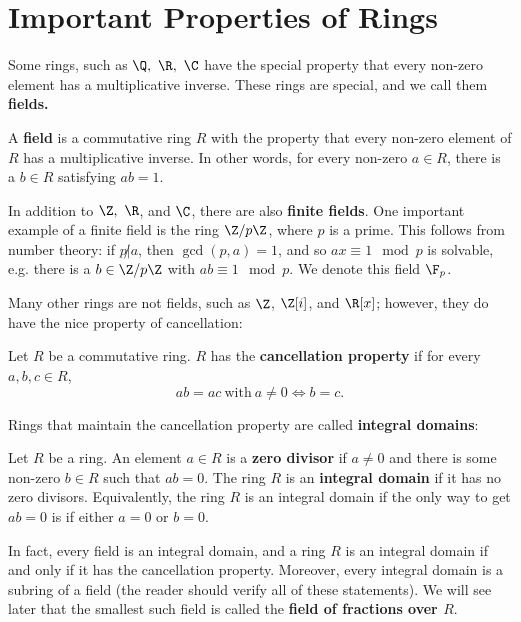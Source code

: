 \documentclass[math1530-lecture-notes]{subfiles}
\begin{document}
\section{Important Properties of Rings}

Some rings, such as $\Q,\ \R,\ \C$ have the special property that every non-zero element has a
multiplicative inverse. These rings are special, and we call them \textbf{fields.} 
\begin{definition}[Fields]{}
  A \textbf{field} is a commutative ring $R$ with the property that every non-zero element of $R$ 
  has a multiplicative inverse. In other words, for every non-zero $a\in R$, there is a $b\in R$ 
  satisfying $ab=1$.
\end{definition}

\begin{example}
  In addition to $\Z,\ \R$, and $\C$, there are also \textbf{finite fields}. One important example
  of a finite field is the ring $\Z / p\Z$, where $p$ is a prime. This follows from number theory:
  if $p \not| a$, then $ \gcd{(p,a)}=1$, and so $ax\equiv 1\mod{p}$ is solvable, e.g. there is a
  $b\in \Z / p\Z$ with $ab\equiv 1\mod{p}$. We denote this field $\F_{p}$.
\end{example}

Many other rings are not fields, such as $\Z$, $\Z[i]$, and $\R[x]$; however, they do have the nice
property of cancellation:
\begin{definition}{}
  Let $R$ be a commutative ring. $R$ has the \textbf{cancellation property} if for every $a,b,c\in
  R$, \[
    ab=ac ~\text{with}~ a\neq 0 \iff b=c
  .\] 
\end{definition}

Rings that maintain the cancellation property are called \textbf{integral domains}:
\begin{definition}{}
  Let $R$ be a ring. An element $a\in R$ is a \textbf{zero divisor} if $a\neq 0$ and there is some
  non-zero $b\in R$ such that $ab=0$. The ring $R$ is an \textbf{integral domain} if it has no zero
  divisors. Equivalently, the ring $R$ is an integral domain if the only way to get $ab=0$ is if
  either $a=0$ or $b=0$.
\end{definition}

In fact, every field is an integral domain, and a ring $R$ is an integral domain if and only if it
has the cancellation property. Moreover, every integral domain is a subring of a field (the reader
should verify all of these statements). We will see later that the smallest such field is called the
\textbf{field of fractions over $R$}.
\end{document}
